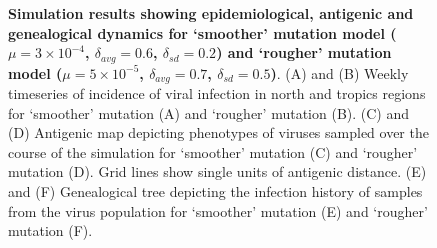 \documentclass[11pt,oneside,letterpaper]{article}
\begin{document}
\pagebreak

\vspace*{\fill}
\begin{figure}[H]
	\centering
	\caption{\textbf{Simulation results showing epidemiological, antigenic and genealogical dynamics for `smoother' mutation model ($\mu = 3 \times 10^{-4}$, $\delta_{avg} = 0.6$, $\delta_{sd} = 0.2$) and `rougher' mutation model ($\mu = 5 \times 10^{-5}$, $\delta_{avg} = 0.7$, $\delta_{sd} = 0.5$)}. (A) and (B) Weekly timeseries of incidence of viral infection in north and tropics regions for `smoother' mutation (A) and `rougher' mutation (B). (C) and (D) Antigenic map depicting phenotypes of viruses sampled over the course of the simulation for `smoother' mutation (C) and `rougher' mutation (D).  Grid lines show single units of antigenic distance. (E) and (F) Genealogical tree depicting the infection history of samples from the virus population for `smoother' mutation (E) and `rougher' mutation (F).}
	\label{mutationcomp}
\end{figure}
\vspace*{\fill}

\pagebreak
\end{document}
